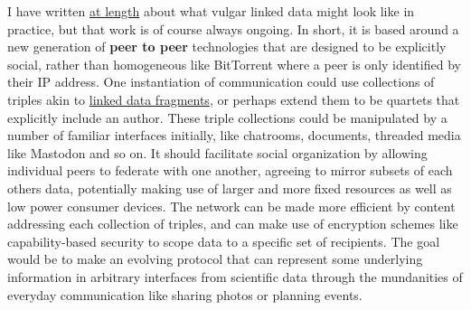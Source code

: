 I have written \href{https://jon-e.net/infrastructure}{at length} about
what vulgar linked data might look like in practice, but that work is of
course always ongoing. In short, it is based around a new generation of
\textbf{peer to peer} technologies that are designed to be
explicitly social, rather than homogeneous like BitTorrent where a peer
is only identified by their IP address. One instantiation of
communication could use collections of triples akin to
\href{https://linkeddatafragments.org/concept/}{linked data fragments},
or perhaps extend them to be quartets that explicitly include an author.
These triple collections could be manipulated by a number of familiar
interfaces initially, like chatrooms, documents, threaded media like
Mastodon and so on. It should facilitate social organization by allowing
individual peers to federate with one another, agreeing to mirror
subsets of each others data, potentially making use of larger and more
fixed resources as well as low power consumer devices. The network can
be made more efficient by content addressing each collection of triples,
and can make use of encryption schemes like capability-based security to
scope data to a specific set of recipients. The goal would be to make an
evolving protocol that can represent some underlying information in
arbitrary interfaces from scientific data through the mundanities of
everyday communication like sharing photos or planning events.

